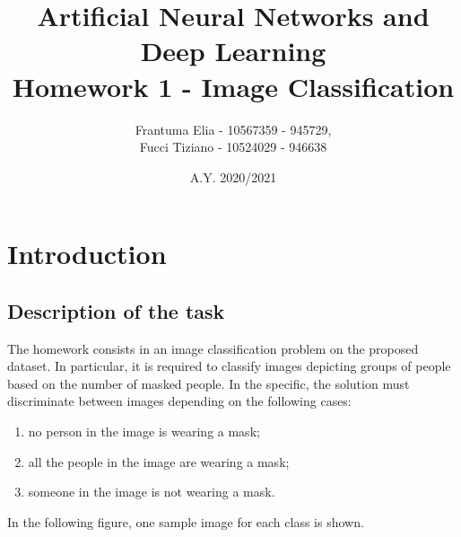 \documentclass[12pt,a4paper]{report}
\title{Artificial Neural Networks and Deep Learning \\ Homework 1 - Image Classification}
\author{Frantuma Elia - 10567359 - 945729, \\
		Fucci Tiziano - 10524029 - 946638}
\date{A.Y. 2020/2021}
\begin{document}
	\maketitle
	\tableofcontents
	\chapter{Introduction}
		\section{Description of the task}
			The homework consists in an image classification problem on the proposed dataset. In particular, it is required to classify images depicting groups of people based on the number of masked people. In the specific, the solution must discriminate between images depending on the following cases:

\begin{enumerate} 
	\item no person in the image is wearing a mask;
	\item all the people in the image are wearing a mask;
	\item someone in the image is not wearing a mask.
\end{enumerate}
In the following figure, one sample image for each class is shown.
\end{document}
